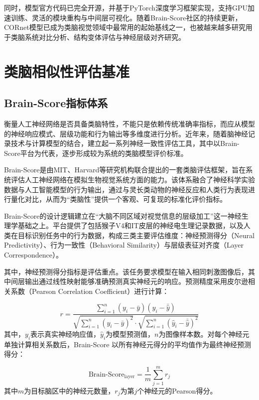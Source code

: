 同时，模型官方代码已完全开源，并基于PyTorch深度学习框架实现，支持GPU加速训练、灵活的模块重构与中间层可视化。随着Brain-Score社区的持续更新，CORnet模型已成为类脑视觉领域中最常用的起始基线之一，也被越来越多研究用于类脑系统对比分析、结构变体评估与神经层级对齐研究。

\section{类脑相似性评估基准}

\subsection{Brain-Score指标体系}

衡量人工神经网络是否具备类脑特性，不能只是依赖传统准确率指标，而应从模型的神经响应模式、层级功能和行为输出等多维度进行分析。近年来，随着脑神经记录技术与计算模型的结合，建立起一系列神经一致性评估工具，其中以Brain-Score平台为代表，逐步形成较为系统的类脑模型评价标准。

Brain-Score是由MIT、Harvard等研究机构联合提出的一套类脑评估框架，旨在系统评估人工神经网络在模拟生物视觉系统方面的能力。该体系融合了神经科学实验数据与人工智能模型的行为输出，通过与灵长类动物的神经反应和人类行为表现进行量化对比，从而为“类脑性”提供一个客观、可复现的标准化评价指标\cite{schrimpf2018brain}。

Brain-Score的设计逻辑建立在“大脑不同区域对视觉信息的层级加工”这一神经生理学基础之上。平台提供了包括猴子V4和IT皮层的神经电生理记录数据，以及人类在目标识别任务中的行为数据，构成三类主要评估维度：神经预测得分（Neural Predictivity）、行为一致性（Behavioral Similarity）与层级表征对齐度（Layer Correspondence）。

其中，神经预测得分指标是评估重点。该任务要求模型在输入相同刺激图像后，其中间层输出通过线性映射能够准确预测真实神经元的响应。预测精度采用皮尔逊相关系数（Pearson Correlation Coefficient）进行计算：

\begin{equation}
	r = 
	\frac{
		\sum_{i=1}^{n}(y_i - \bar{y})(\hat{y}_i - \bar{\hat{y}})
	}{
		\sqrt{\sum_{i=1}^{n}(y_i - \bar{y})^2} \cdot \sqrt{\sum_{i=1}^{n}(\hat{y}_i - \bar{\hat{y}})^2}
	}
	\label{eq:pearson}
\end{equation}
其中，$y_i$表示真实神经响应值，$\hat{y}_i$为模型预测值，$n$为图像样本数。对每个神经元单独计算相关系数后，Brain-Score 以所有神经元得分的平均值作为最终神经预测得分：

\begin{equation}
	\text{Brain-Score}_{\text{layer}} = \frac{1}{m} \sum_{j=1}^{m} r_j
	\label{eq:brain_score}
\end{equation}
其中$m$为目标脑区中的神经元数量，$r_j$为第$j$个神经元的Pearson得分。

